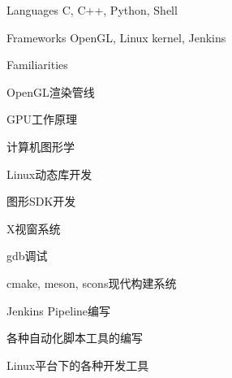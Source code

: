 
\begin{cvskills}
  \cvskill
    {Languages} %
    {C, C++, Python, Shell} %

  \cvskill
    {Frameworks} %
    {OpenGL, Linux kernel, Jenkins} %
\end{cvskills}

\begin{cventries}
  \cventry
    {} %
    {Familiarities} %
    {\hspace{1cm}} %
    {} %
    {
      \begin{cvitems} %
        \item {OpenGL渲染管线}
        \item {GPU工作原理}
        \item {计算机图形学}
        \item {Linux动态库开发}
        \item {图形SDK开发}
        \item {X视窗系统}
        \item {gdb调试}
        \item {cmake, meson, scons现代构建系统}
        \item {Jenkins Pipeline编写}
        \item {各种自动化脚本工具的编写}
        \item {Linux平台下的各种开发工具}
      \end{cvitems}
    }
\end{cventries}
